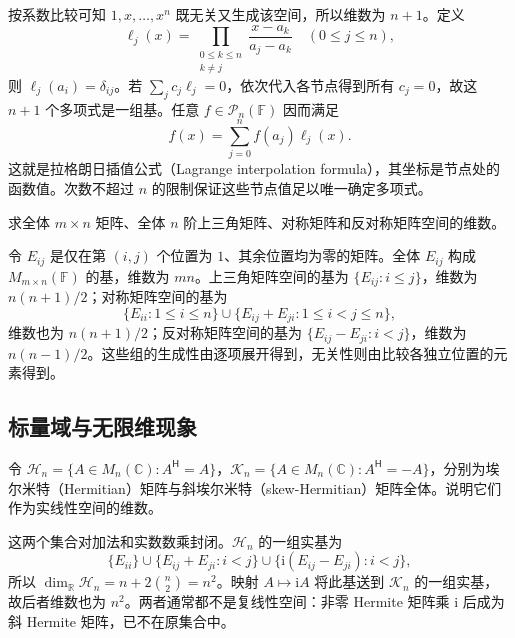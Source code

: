 \begin{solve}
按系数比较可知 $1,x,\ldots,x^n$ 既无关又生成该空间，所以维数为 $n+1$。定义
\[
\ell_j(x)=\prod_{\substack{0\le k\le n\\k\ne j}}
\frac{x-a_k}{a_j-a_k}\quad(0\le j\le n),
\]
则 $\ell_j(a_i)=\delta_{ij}$。若 $\sum_j c_j\ell_j=0$，依次代入各节点得到所有 $c_j=0$，故这 $n+1$ 个多项式是一组基。任意 $f\in\mathcal P_n(\mathbb F)$ 因而满足
\[
f(x)=\sum_{j=0}^n f(a_j)\ell_j(x).
\]
这就是拉格朗日插值公式（Lagrange interpolation formula），其坐标是节点处的函数值。次数不超过 $n$ 的限制保证这些节点值足以唯一确定多项式。
\end{solve}

\begin{example}
\label{ex:laex-matrix-bases}
求全体 $m\times n$ 矩阵、全体 $n$ 阶上三角矩阵、对称矩阵和反对称矩阵空间的维数。
\end{example}

\begin{solve}
令 $E_{ij}$ 是仅在第 $(i,j)$ 个位置为 $1$、其余位置均为零的矩阵。全体 $E_{ij}$ 构成 $M_{m\times n}(\mathbb F)$ 的基，维数为 $mn$。上三角矩阵空间的基为 $\{E_{ij}:i\le j\}$，维数为 $n(n+1)/2$；对称矩阵空间的基为
\[
\{E_{ii}:1\le i\le n\}\cup
\{E_{ij}+E_{ji}:1\le i<j\le n\},
\]
维数也为 $n(n+1)/2$；反对称矩阵空间的基为 $\{E_{ij}-E_{ji}:i<j\}$，维数为 $n(n-1)/2$。这些组的生成性由逐项展开得到，无关性则由比较各独立位置的元素得到。
\end{solve}

\subsection{标量域与无限维现象}

\begin{example}
\label{ex:laex-hermitian}
令 $\mathcal H_n=\{A\in M_n(\mathbb C):A^{\mathsf H}=A\}$，$\mathcal K_n=\{A\in M_n(\mathbb C):A^{\mathsf H}=-A\}$，分别为埃尔米特（Hermitian）矩阵与斜埃尔米特（skew-Hermitian）矩阵全体。说明它们作为实线性空间的维数。
\end{example}

\begin{solve}
这两个集合对加法和实数数乘封闭。$\mathcal H_n$ 的一组实基为
\[
\{E_{ii}\}\cup\{E_{ij}+E_{ji}:i<j\}
\cup\{\mathrm i(E_{ij}-E_{ji}):i<j\},
\]
所以 $\dim_{\mathbb R}\mathcal H_n=n+2\binom n2=n^2$。映射 $A\mapsto\mathrm iA$ 将此基送到 $\mathcal K_n$ 的一组实基，故后者维数也为 $n^2$。两者通常都不是复线性空间：非零 Hermite 矩阵乘 $\mathrm i$ 后成为斜 Hermite 矩阵，已不在原集合中。
\end{solve}

